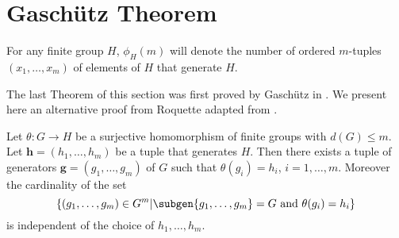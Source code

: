 \section{Gaschütz Theorem}

\begin{definition}
    For any finite group $H$, $\phi_H(m)$ will denote the number of ordered $m$-tuples $(x_1,\ldots ,x_m)$ of elements of $H$ that generate $H$.
\end{definition}

The last Theorem of this section was first proved by Gaschütz in \cite{GaschützZENGP}. We present here an alternative proof from Roquette adapted from \cite[p.~360]{FriedFA}.

\begin{theorem}
    \label{S1:GT}
    Let $\theta : G \rightarrow H$ be a surjective homomorphism of finite groups with $d(G) \le m$. 
    Let $\mathbf{h} = (h_1, \ldots , h_m)$ be a tuple that generates $H$.
    Then there exists a tuple of generators $\mathbf{g}=(g_1, \ldots , g_m)$ of $G$ such that $\theta(g_i) = h_i$, $i = 1,\ldots ,m$.
    Moreover the cardinality of the set $$\left\{(g_1,\ldots ,g_m) \in G^m |\subgen{g_1,\ldots ,g_m} = G \text{ and } \theta(g_i) = h_i \right\}$$ is independent of the choice of $h_1, \ldots , h_m$.
\end{theorem}

